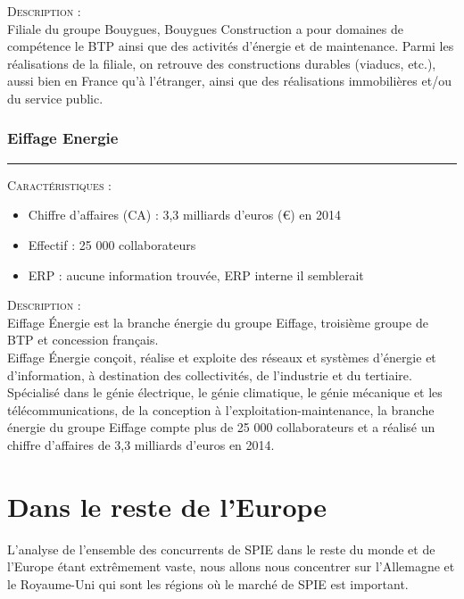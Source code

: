 \noindent\textsc{Description} : \\

Filiale du groupe Bouygues, Bouygues Construction a pour domaines de compétence le BTP ainsi que des activités d’énergie et de maintenance. Parmi les réalisations de la filiale, on retrouve des constructions durables (viaducs, etc.), aussi bien en France qu’à l’étranger, ainsi que des réalisations immobilières et/ou du service public.

\subsubsection{Eiffage Energie}
\hrule

\begin{shaded}
    \noindent\textsc{Caractéristiques} : \\
    \begin{itemize}
        \item Chiffre d'affaires (CA) : 3,3 milliards d'euros (€) en 2014
        \item Effectif : 25 000 collaborateurs 
        \item ERP : aucune information trouvée, ERP interne il semblerait
    \end{itemize}
\end{shaded}

\noindent\textsc{Description} : \\

Eiffage Énergie est la branche énergie du groupe Eiffage, troisième groupe de BTP et concession français. \\

Eiffage Énergie conçoit, réalise et exploite des réseaux et systèmes d'énergie et d'information, à destination des collectivités, de l’industrie et du tertiaire.
Spécialisé dans le génie électrique, le génie climatique, le génie mécanique et les télécommunications, de la conception à l’exploitation-maintenance, la branche énergie du groupe Eiffage compte plus de 25 000 collaborateurs et a réalisé un chiffre d’affaires de 3,3 milliards d’euros en 2014.

\section{Dans le reste de l'Europe}
    
L’analyse de l’ensemble des concurrents de SPIE dans le reste du monde et de l’Europe étant extrêmement vaste, nous allons nous concentrer sur l’Allemagne et le Royaume-Uni qui sont les régions où le marché de SPIE est important.

